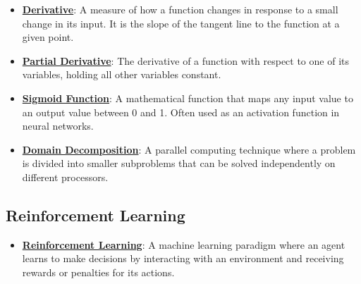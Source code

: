 \documentclass{article}%
\begin{document}
\begin{itemize}[leftmargin=*]
\item \href{https://purdue.brightspace.com/d2l/common/assets/pdfjs-d2l-dist/1.0.14-legacy/web/viewer.html?file=\%2Fcontent\%2Fenforced\%2F1095467-wl.202510.CS.24300.001\%2F04L1-Linear Algebra Primer.pdf\%3Fou\%3D1095467\&lang=en-us\&container=d2l-fileviewer-rendered-pdf\&fullscreen=d2l-fileviewer-rendered-pdf-dialog\&height=667#page=21}{\textbf{Derivative}}: A measure of how a function changes in response to a small change in its input. It is the slope of the tangent line to the function at a given point.%
\item \href{https://purdue.brightspace.com/d2l/common/assets/pdfjs-d2l-dist/1.0.14-legacy/web/viewer.html?file=\%2Fcontent\%2Fenforced\%2F1095467-wl.202510.CS.24300.001\%2F04L1-Linear Algebra Primer.pdf\%3Fou\%3D1095467\&lang=en-us\&container=d2l-fileviewer-rendered-pdf\&fullscreen=d2l-fileviewer-rendered-pdf-dialog\&height=667#page=19}{\textbf{Partial Derivative}}: The derivative of a function with respect to one of its variables, holding all other variables constant.%
\item \href{https://purdue.brightspace.com/d2l/common/assets/pdfjs-d2l-dist/1.0.14-legacy/web/viewer.html?file=\%2Fcontent\%2Fenforced\%2F1095467-wl.202510.CS.24300.001\%2F04L1-Linear Algebra Primer.pdf\%3Fou\%3D1095467\&lang=en-us\&container=d2l-fileviewer-rendered-pdf\&fullscreen=d2l-fileviewer-rendered-pdf-dialog\&height=667#page=21}{\textbf{Sigmoid Function}}: A mathematical function that maps any input value to an output value between 0 and 1. Often used as an activation function in neural networks.%
\item \href{https://purdue.brightspace.com/d2l/common/assets/pdfjs-d2l-dist/1.0.14-legacy/web/viewer.html?file=\%2Fcontent\%2Fenforced\%2F1095467-wl.202510.CS.24300.001\%2F04L1-Linear Algebra Primer.pdf\%3Fou\%3D1095467\&lang=en-us\&container=d2l-fileviewer-rendered-pdf\&fullscreen=d2l-fileviewer-rendered-pdf-dialog\&height=667#page=18}{\textbf{Domain Decomposition}}: A parallel computing technique where a problem is divided into smaller subproblems that can be solved independently on different processors.%
\end{itemize}

%
\subsection{Reinforcement Learning}%
\label{subsec:ReinforcementLearning}%
\begin{itemize}[leftmargin=*]%
\item \href{https://purdue.brightspace.com/d2l/common/assets/pdfjs-d2l-dist/1.0.14-legacy/web/viewer.html?file=\%2Fcontent\%2Fenforced\%2F1095467-wl.202510.CS.24300.001\%2F02L2-Intro.pdf\%3Fou\%3D1095467\&lang=en-us\&container=d2l-fileviewer-rendered-pdf\&fullscreen=d2l-fileviewer-rendered-pdf-dialog\&height=667#page=46}{\textbf{Reinforcement Learning}}: A machine learning paradigm where an agent learns to make decisions by interacting with an environment and receiving rewards or penalties for its actions.%
\end{itemize}
\end{document}
